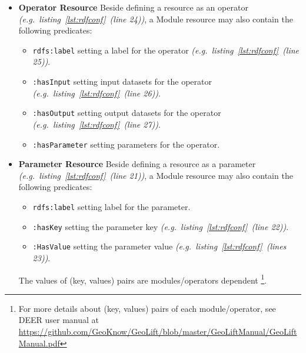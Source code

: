 \documentclass[a4paper,twoside,bibtotoc,abstracton,12pt,BCOR=15mm]{article}
\newcommand{\geolift}{\textsc{DEER}\xspace}
\begin{document}
\begin{itemize}
  \item \textbf{Operator Resource}
    Beside defining a resource as an operator \emph{(e.g.~listing~\ref{lst:rdfconf}~(line 24))},
    a Module resource may also contain the following predicates:
    \begin{itemize}
	\item \texttt{rdfs:label} setting a label for the operator \emph{(e.g.~listing~\ref{lst:rdfconf}~(line 25))}.
	\item \texttt{:hasInput} setting input datasets for the operator \emph{(e.g.~listing~\ref{lst:rdfconf}~(line 26))}.
	\item \texttt{:hasOutput} setting output datasets for the operator \emph{(e.g.~listing~\ref{lst:rdfconf}~(line 27))}.
	\item \texttt{:hasParameter} setting parameters for the operator.
    \end{itemize}

  \item \textbf{Parameter Resource}
    Beside defining a resource as a parameter \emph{(e.g.~listing~\ref{lst:rdfconf}~(line 21))},
    a Module resource may also contain the following predicates:
    \begin{itemize}
	\item \texttt{rdfs:label} setting label for the parameter.
	\item \texttt{:hasKey} setting the parameter key \emph{(e.g.~listing~\ref{lst:rdfconf}~(line 22))}.
	\item \texttt{:HasValue} setting the parameter value \emph{(e.g.~listing~\ref{lst:rdfconf}~(lines 23))}.
    \end{itemize}
    The values of (key, values) pairs are modules/operators dependent    \footnote{For more details about (key, values) pairs of each  module/operator, see \geolift user manual at  \url{https://github.com/GeoKnow/GeoLift/blob/master/GeoLiftManual/GeoLiftManual.pdf}}.
    
\end{itemize}
\end{document}
